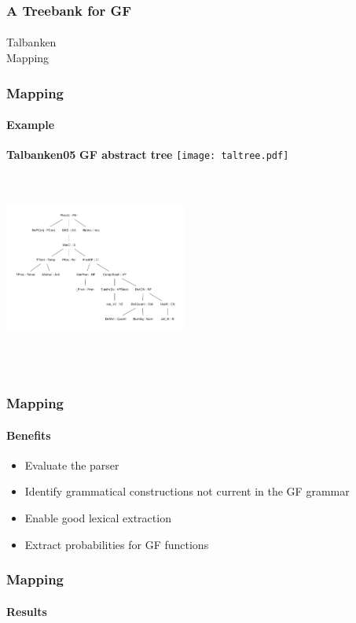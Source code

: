 \documentclass[10pt]{beamer}
\begin{document}
\begin{frame}
\frametitle{A Treebank for GF}
\framesubtitle{} 
Talbanken\\
  \pause
Mapping \\
\end{frame}


\begin{frame}
\frametitle{Mapping}
\framesubtitle{Example} 
\small{\textbf{Talbanken05}}\hspace{160pt}
\small{\textbf{GF abstract tree}}
\texttt{[image: taltree.pdf]}
\includegraphics[width=170pt,height=200pt]{gftree.pdf}
\end{frame}

%
\begin{frame}

\frametitle{Mapping}
\framesubtitle{Benefits} 
\begin{itemize}
\item{Evaluate the parser}
\pause
\item{Identify grammatical constructions not current in the GF grammar}
\pause
\item{Enable good lexical extraction}
\pause
\item{Extract probabilities for GF functions}
\end{itemize}
\end{frame}

\begin{frame}
\frametitle{Mapping}
\framesubtitle{Results} 
\end{frame}
\end{document}
